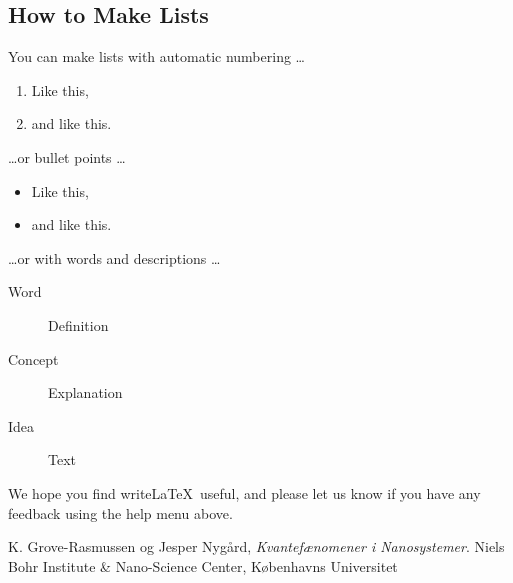 \documentclass[a4paper]{article}
\begin{document}
    \subsection{How to Make Lists}
    
    You can make lists with automatic numbering \dots
    
    \begin{enumerate}
    \item Like this,
    \item and like this.
    \end{enumerate}
    \dots or bullet points \dots
    \begin{itemize}
    \item Like this,
    \item and like this.
    \end{itemize}
    \dots or with words and descriptions \dots
    \begin{description}
    \item[Word] Definition
    \item[Concept] Explanation
    \item[Idea] Text
    \end{description}
    
    We hope you find write\LaTeX\ useful, and please let us know if you have any feedback using the help menu above.
    
    \begin{thebibliography}{9}
      K. Grove-Rasmussen og Jesper Nygård,
      \emph{Kvantefænomener i Nanosystemer}.
      Niels Bohr Institute \& Nano-Science Center, Københavns Universitet
    
    \end{thebibliography}
    
\end{document}
